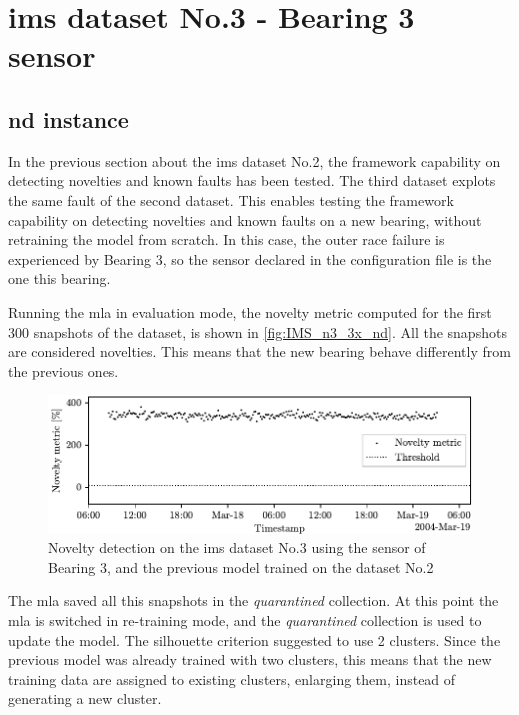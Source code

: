 \section{\gls{ims} dataset No.3 - Bearing 3 sensor}
\label{sec:IMS_n3_3x}

\subsection{\gls{nd} instance}

In the previous section about the \gls{ims} dataset No.2, the framework capability on detecting novelties and known faults has been tested. The third dataset explots the same fault of the second dataset. This enables testing the framework capability on detecting novelties and known faults on a new bearing, without retraining the model from scratch. In this case, the outer race failure is experienced by Bearing 3, so the sensor declared in the configuration file is the one this bearing.

Running the \gls{mla} in evaluation mode, the novelty metric computed for the first 300 snapshots of the dataset, is shown in \autoref{fig:IMS_n3_3x_nd}. All the snapshots are considered novelties. This means that the new bearing behave differently from the previous ones. 

\begin{figure}
    \centering
    \includegraphics{images/IMS/Test03/retrain.pdf}
    \caption{Novelty detection on the \gls{ims} dataset No.3 using the sensor of Bearing 3, and the previous model trained on the dataset No.2}
    \label{fig:IMS_n3_3x_nd}
\end{figure}

The \gls{mla} saved all this snapshots in the \emph{quarantined} collection. At this point the \gls{mla} is switched in re-training mode, and the \emph{quarantined} collection is used to update the model. The silhouette criterion suggested to use 2 clusters. Since the previous model was already trained with two clusters, this means that the new training data are assigned to existing clusters, enlarging them, instead of generating a new cluster. 

